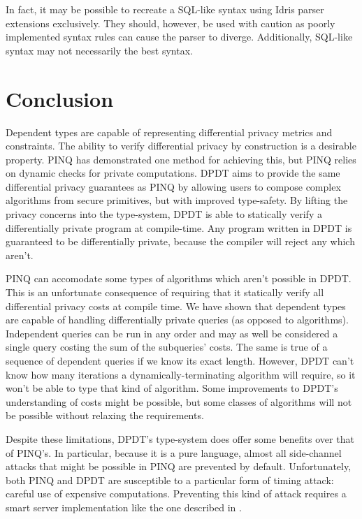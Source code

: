 \documentclass[12pt]{report}
\begin{document}
In fact, it may be possible to recreate a SQL-like syntax using Idris parser extensions exclusively.
They should, however, be used with caution as poorly implemented syntax rules can cause the parser to diverge.
Additionally, SQL-like syntax may not necessarily the best syntax.

\chapter{Conclusion}\label{sec:conclusion}

Dependent types are capable of representing differential privacy metrics and constraints.
The ability to verify differential privacy by construction is a desirable property.
PINQ has demonstrated one method for achieving this, but PINQ relies on dynamic checks for private computations.
DPDT aims to provide the same differential privacy guarantees as PINQ by allowing users to compose complex algorithms from secure primitives, but with improved type-safety.
By lifting the privacy concerns into the type-system, DPDT is able to statically verify a differentially private program at compile-time.
Any program written in DPDT is guaranteed to be differentially private, because the compiler will reject any which aren't.

PINQ can accomodate some types of algorithms which aren't possible in DPDT.
This is an unfortunate consequence of requiring that it statically verify all differential privacy costs at compile time.
We have shown that dependent types are capable of handling differentially private queries (as opposed to algorithms).
Independent queries can be run in any order and may as well be considered a single query costing the sum of the subqueries' costs.
The same is true of a sequence of dependent queries if we know its exact length.
However, DPDT can't know how many iterations a dynamically-terminating algorithm will require, so it won't be able to type that kind of algorithm.
Some improvements to DPDT's understanding of costs might be possible, but some classes of algorithms will not be possible without relaxing the requirements.

Despite these limitations, DPDT's type-system does offer some benefits over that of PINQ's.
In particular, because it is a pure language, almost all side-channel attacks that might be possible in PINQ are prevented by default.
Unfortunately, both PINQ and DPDT are susceptible to a particular form of timing attack: careful use of expensive computations.
Preventing this kind of attack requires a smart server implementation like the one described in \cite{conf/uss/HaeberlenPN11}.
\end{document}
